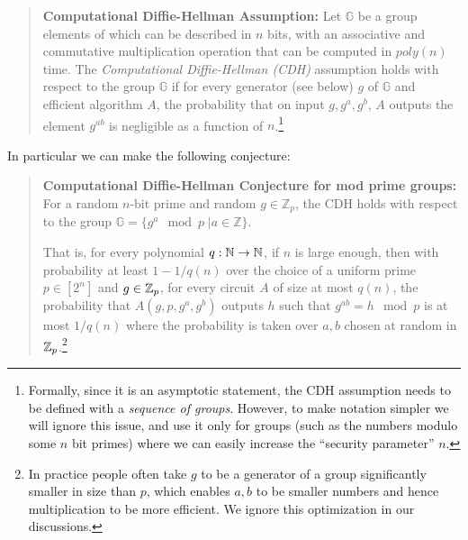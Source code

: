 \begin{quote}
\textbf{Computational Diffie-Hellman Assumption:} Let \(\mathbb{G}\) be
a group elements of which can be described in \(n\) bits, with an
associative and commutative multiplication operation that can be
computed in \(poly(n)\) time. The \emph{Computational Diffie-Hellman
(CDH)} assumption holds with respect to the group \(\mathbb{G}\) if for
every generator (see below) \(g\) of \(\mathbb{G}\) and efficient
algorithm \(A\), the probability that on input \(g,g^a,g^b\), \(A\)
outputs the element \(g^{ab}\) is negligible as a function of
\(n\).\footnote{Formally, since it is an asymptotic statement, the CDH
  assumption needs to be defined with a \emph{sequence of groups}.
  However, to make notation simpler we will ignore this issue, and use
  it only for groups (such as the numbers modulo some \(n\) bit primes)
  where we can easily increase the ``security parameter'' \(n\).}
\end{quote}

In particular we can make the following conjecture:

\begin{quote}
\textbf{Computational Diffie-Hellman Conjecture for mod prime groups:}
For a random \(n\)-bit prime and random \(g \in \mathbb{Z}_p\), the CDH
holds with respect to the group
\(\mathbb{G} = \{ g^a \mod p \;| a\in \mathbb{Z} \}\).

That is, for every polynomial \(q:{\mathbb{N}} \rightarrow {\mathbb{N}}\), if \(n\) is large
enough, then with probability at least \(1-1/q(n)\) over the choice of a
uniform prime \(p\in [2^n]\) and \(g\in {\mathbb{Z}}_p\), for every circuit \(A\)
of size at most \(q(n)\), the probability that \(A(g,p,g^a,g^b)\)
outputs \(h\) such that \(g^{ab} = h \mod p\) is at most \(1/q(n)\)
where the probability is taken over \(a,b\) chosen at random in
\({\mathbb{Z}}_p\).\footnote{In practice people often take \(g\) to be a generator
  of a group significantly smaller in size than \(p\), which enables
  \(a,b\) to be smaller numbers and hence multiplication to be more
  efficient. We ignore this optimization in our discussions.}
\end{quote}


